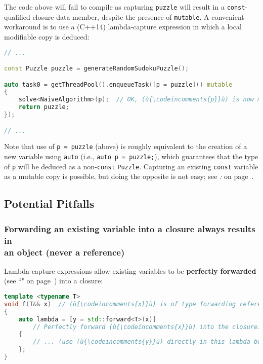 \noindent The code above will fail to compile as capturing \texttt{puzzle} will
result in a \texttt{const}-qualified closure data member, despite the
presence of \texttt{mutable}. A convenient workaround is to use a
(C++14) lambda-capture expression in which a local modifiable copy is deduced:

\begin{lstlisting}[language=C++]
// ...

const Puzzle puzzle = generateRandomSudokuPuzzle();

auto task0 = getThreadPool().enqueueTask([p = puzzle]() mutable
{
    solve<NaiveAlgorithm>(p);  // OK, (ù{\codeincomments{p}}ù) is now modifiable.
    return puzzle;
});

// ...
\end{lstlisting}

\noindent Note that use of \texttt{p}~\texttt{=}~\texttt{puzzle} (above) is
roughly equivalent to the creation of a new variable using
\texttt{auto} (i.e.,
\texttt{auto}~\texttt{p}~\texttt{=}~\texttt{puzzle;}), which guarantees
that the type of \texttt{p} will be deduced as a non-\texttt{const}
\texttt{Puzzle}. Capturing an existing \texttt{const} variable as a mutable copy is
possible, but doing the opposite is not easy; see
\textit{: } on page~\pageref{there’s-no-easy-way-to-synthesize-a-const-data-member}.

\subsection[Potential Pitfalls]{Potential Pitfalls}\label{potential-pitfalls-lambdacapture}

\subsubsection[Forwarding an existing variable into a closure always results in an object (never a reference)]{Forwarding an existing variable into a closure always results in\\ an object (never a reference)}\label{forwarding-an-existing-variable-into-a-closure-always-results-in-an-object-(never-a-reference)}

Lambda-capture expressions allow existing variables to be
\textbf{perfectly forwarded} (see ``" on page~\pageref{forwardingref})
into a closure:

\begin{lstlisting}[language=C++]
template <typename T>
void f(T&& x)  // (ù{\codeincomments{x}}ù) is of type forwarding reference to (ù{\codeincomments{T}}ù).
{
    auto lambda = [y = std::forward<T>(x)]
        // Perfectly forward (ù{\codeincomments{x}}ù) into the closure.
    {
        // ... (use (ù{\codeincomments{y}}ù) directly in this lambda body)
    };
}
\end{lstlisting}

